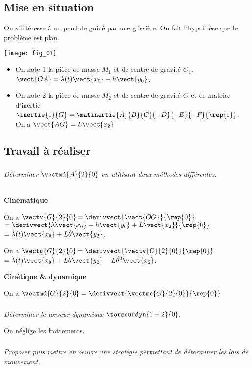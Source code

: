 \ifprof
\else
\begin{multicols}{2}
\fi

\subsection*{Mise en situation}
On s'intéresse à un pendule guidé par une glissière. On fait l'hypothèse que le problème est plan. 

\begin{center}
\texttt{[image: fig\_01]}
\end{center}
\begin{itemize}
\item On note 1 la pièce de masse $M_1$ et de centre de gravité $G_1$. $\vect{OA}=\lambda(t)\vect{x_0}-h\vect{y_0}$.
\item On note 2 la pièce de masse $M_2$ et de centre de gravité $G$ et de matrice d'inertie $\inertie{1}{G}= \matinertie{A}{B}{C}{-D}{-E}{-F}{\rep{1}}$. On a $\vect{AG}=L\vect{x_2}$
\end{itemize}

\subsection*{Travail à réaliser}

\subparagraph{}
\textit{Déterminer $\vectmd{A}{2}{0}$ en utilisant deux méthodes différentes. }
\ifprof
\begin{corrige}
~\\

\textbf{Cinématique}

On a $\vectv{G}{2}{0}=\derivvect{\vect{OG}}{\rep{0}} $ 
$=\derivvect{\lambda\vect{x_0}-h\vect{y_0}+L\vect{x_2}}{\rep{0}}$ 
$=\dot{\lambda}(t)\vect{x_0}+L\dot{\theta}\vect{y_2}$.



On a $\vectg{G}{2}{0}=\derivvect{\vectv{G}{2}{0}}{\rep{0}} $ 
$=\ddot{\lambda}(t)\vect{x_0}+L\ddot{\theta}\vect{y_2}-L\dot{\theta}^2\vect{x_2}$.

\textbf{Cinétique \& dynamique}


On a $\vectmd{G}{2}{0} = \derivvect{\vectmc{G}{2}{0}}{\rep{0}} $
\end{corrige}
\else
\fi



\subparagraph{}
\textit{Déterminer le torseur dynamique $\torseurdyn{1+2}{0}$. }
\ifprof
\begin{corrige}
\end{corrige}
\else
\fi

On néglige les frottements.

\subparagraph{}
\textit{Proposer puis mettre en oeuvre une stratégie permettant de déterminer les lois de mouvement. }
\ifprof
\begin{corrige}
\end{corrige}
\else
\fi


\ifprof
\else
\end{multicols}
\fi

